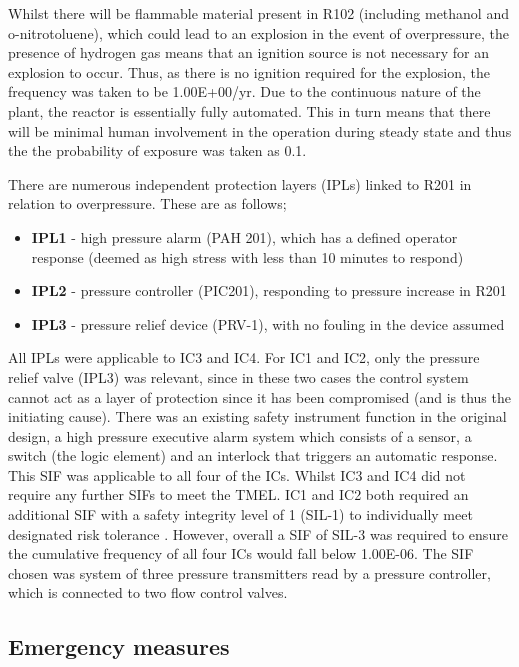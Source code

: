 Whilst there will be flammable material present in R102 (including methanol and o-nitrotoluene), which could lead to an explosion in the event of overpressure, the presence of hydrogen gas means that an ignition source is not necessary for an explosion to occur. Thus, as there is no ignition required for the explosion, the frequency was taken to be 1.00E+00/yr. Due to the continuous nature of the plant, the reactor is essentially fully automated. This in turn means that there will be minimal human involvement in the operation during steady state and thus the the probability of exposure was taken as 0.1. 

There are numerous  independent protection layers (IPLs) linked to R201 in relation to overpressure. These are as follows;
 
 \begin{itemize}
\item \textbf{IPL1} - high pressure alarm (PAH 201), which has a defined operator response (deemed as high stress with less than 10 minutes to respond)
\item  \textbf{IPL2} - pressure controller (PIC201), responding to pressure increase in R201
\item  \textbf{IPL3} - pressure relief device (PRV-1), with no fouling in the device assumed
 \end{itemize}

All IPLs were applicable to IC3 and IC4. For IC1 and IC2, only the pressure relief valve (IPL3) was relevant, since in these two cases the control system cannot act  as a layer of protection since it has been compromised (and is thus the initiating cause). There was an existing safety instrument function in the original design, a high pressure executive alarm system which consists of a sensor, a switch (the logic element) and an interlock that triggers an automatic response. This SIF was applicable to all four of the ICs. Whilst IC3 and IC4 did not require any further SIFs to meet the TMEL. IC1 and IC2 both required an additional SIF with a safety integrity level of 1 (SIL-1) to individually meet designated risk tolerance . However, overall a SIF of SIL-3 was required to ensure the cumulative frequency of all four ICs would fall below 1.00E-06. The SIF chosen was system of three pressure transmitters read by a pressure controller, which is connected to two flow control valves. 


\subsection{Emergency measures }


